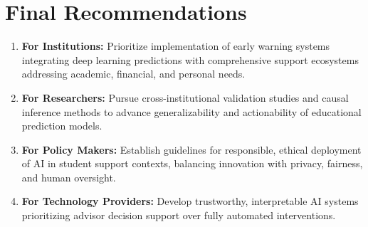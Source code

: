 \section{Final Recommendations}

\begin{enumerate}
\item \textbf{For Institutions:} Prioritize implementation of early warning systems integrating deep learning predictions with comprehensive support ecosystems addressing academic, financial, and personal needs.

\item \textbf{For Researchers:} Pursue cross-institutional validation studies and causal inference methods to advance generalizability and actionability of educational prediction models.

\item \textbf{For Policy Makers:} Establish guidelines for responsible, ethical deployment of AI in student support contexts, balancing innovation with privacy, fairness, and human oversight.

\item \textbf{For Technology Providers:} Develop trustworthy, interpretable AI systems prioritizing advisor decision support over fully automated interventions.
\end{enumerate}
